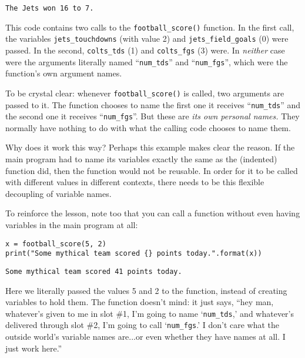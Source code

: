 \begin{Verbatim}[fontsize=\small,samepage=true,frame=leftline,framesep=5mm,framerule=1mm]
The Jets won 16 to 7.
\end{Verbatim}

This code contains two calls to the \texttt{football\_score()} function. In the
first call, the variables \texttt{jets\_touchdowns} (with value 2) and
\texttt{jets\_field\_goals} (0) were passed. In the second,
\texttt{colts\_tds} (1) and \texttt{colts\_fgs} (3) were. In
\textit{neither} case were the arguments literally named ``\texttt{num\_tds}''
and ``\texttt{num\_fgs}'', which were the function's own argument names.

To be crystal clear: whenever \texttt{football\_score()} is called, two
arguments are passed to it. The function chooses to name the first one it
receives ``\texttt{num\_tds}'' and the second one it receives
``\texttt{num\_fgs}''. But these are \textit{its own personal names.} They
normally have nothing to do with what the calling code chooses to name them.

Why does it work this way? Perhaps this example makes clear the reason. If the
main program had to name its variables exactly the same as the (indented)
function did, then the function would not be reusable. In order for it to be
called with different values in different contexts, there needs to be this
flexible decoupling of variable names.

To reinforce the lesson, note too that you can call a function without even
having variables in the main program at all:

\begin{Verbatim}[fontsize=\small,samepage=true,frame=single,framesep=3mm]
x = football_score(5, 2)
print("Some mythical team scored {} points today.".format(x))
\end{Verbatim}
\vspace{-.2in}

\begin{Verbatim}[fontsize=\small,samepage=true,frame=leftline,framesep=5mm,framerule=1mm]
Some mythical team scored 41 points today.
\end{Verbatim}

Here we literally passed the values 5 and 2 to the function, instead of
creating variables to hold them. The function doesn't mind: it just says, ``hey
man, whatever's given to me in slot \#1, I'm going to name `\texttt{num\_tds},'
and whatever's delivered through slot \#2, I'm going to call
`\texttt{num\_fgs}.' I don't care what the outside world's variable names
are...or even whether they have names at all. I just work here.''

